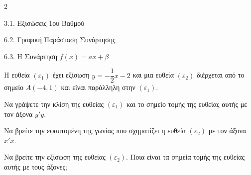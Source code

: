 \begin{ylh}{2}
    \item 3.1. Εξισώσεις 1ου Βαθμού
    \item 6.2. Γραφική Παράσταση Συνάρτησης
    \item 6.3. Η Συνάρτηση $f(x)=ax+\beta$
\end{ylh}
Η ευθεία $(\varepsilon_{1})$ έχει εξίσωση $y = -\dfrac{1}{2}x - 2$ και μια ευθεία $(\varepsilon_{2})$ διέρχεται από το σημείο $A(-4, 1)$ και είναι παράλληλη στην $(\varepsilon_{1})$.
\begin{alist}
\item Να γράψετε την κλίση της ευθείας $(\varepsilon_{1})$ και το σημείο τομής της ευθείας αυτής με τον άξονα $y'y$.
\item Να βρείτε την εφαπτομένη της γωνίας που σχηματίζει η ευθεία $(\varepsilon_{2})$ με τον άξονα $x'x$.
\item Να βρείτε την εξίσωση της ευθείας $(\varepsilon_{2})$. Ποια είναι τα σημεία τομής της ευθείας αυτής με τους άξονες;
\end{alist}

